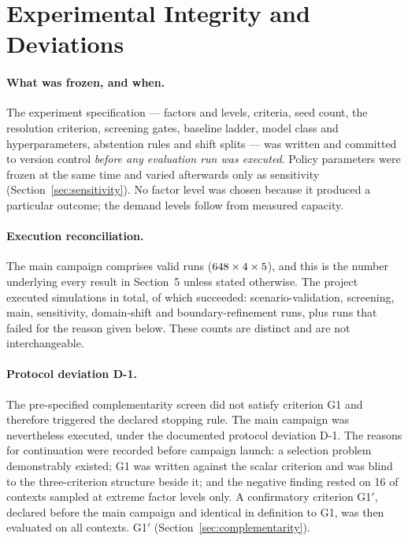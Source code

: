 \section{Experimental Integrity and Deviations}
\label{sec:integrity}

\paragraph{What was frozen, and when.} The experiment specification --- factors
and levels, criteria, seed count, the resolution criterion, screening gates,
baseline ladder, model class and hyperparameters, abstention rules and shift
splits --- was written and committed to version control \emph{before any
evaluation run was executed}. Policy parameters were frozen at the same time and
varied afterwards only as sensitivity (Section~\ref{sec:sensitivity}). No factor level was chosen
because it produced a particular outcome; the demand levels follow from measured
capacity.

\paragraph{Execution reconciliation.} The main campaign comprises
\NumRunsMain{} valid runs ($648 \times 4 \times 5$),
and this is the number underlying every result in Section~5 unless stated
otherwise. The project executed \NumRunsTotalAttempted{} simulations in total,
of which \NumRunsTotalSucceeded{} succeeded: \NumRunsValidate{}
scenario-validation, \NumRunsScreen{} screening, \NumRunsMain{} main,
\NumRunsSens{} sensitivity, \NumRunsOODNorth{} domain-shift and
\NumRunsBoundary{} boundary-refinement runs, plus \NumRunsFailedBypass{} runs
that failed for the reason given below. These counts are distinct and are not
interchangeable.

\paragraph{Protocol deviation D-1.} The pre-specified complementarity screen did
not satisfy criterion G1 and therefore triggered the declared stopping rule. The
main campaign was nevertheless executed, under the documented protocol deviation
D-1. The reasons for continuation were recorded before campaign launch: a
selection problem demonstrably existed; G1 was written against the scalar
criterion and was blind to the three-criterion structure beside it; and the
negative finding rested on 16 of \NumContexts{} contexts sampled at extreme
factor levels only. A confirmatory criterion G1$'$, declared before the main
campaign and identical in definition to G1, was then evaluated on all
\NumContexts{} contexts. G1$'$ \NumGOneVerdict{}
(Section~\ref{sec:complementarity}).

